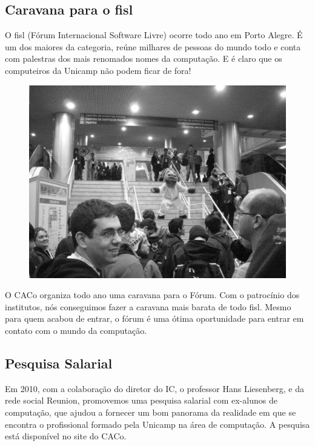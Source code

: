 \subsection{Caravana para o fisl}

O fisl (Fórum Internacional Software Livre) ocorre todo ano em Porto Alegre.
É um dos maiores da categoria, reúne milhares de pessoas do mundo todo e conta
com palestras dos mais renomados nomes da computação. E é claro que os
computeiros da Unicamp não podem ficar de fora!
\begin{figure}[h!]
    \vspace{-10pt}
    \centering
    \includegraphics[scale=0.58, keepaspectratio=true]{img/imgs/21-CACo/fisl11_1.jpg}
    \vspace{-10pt}
\end{figure}
O CACo organiza todo ano uma
caravana para o Fórum. Com o patrocínio dos institutos, nós conseguimos fazer
a caravana mais barata de todo fisl. Mesmo para quem acabou de entrar, o fórum
é uma ótima oportunidade para entrar em contato com o mundo da computação.

\subsection{Pesquisa Salarial}

Em 2010, com a colaboração do diretor do IC, o professor Hans Liesenberg,
e da rede social Reunion, promovemos uma pesquisa salarial com
ex-alunos de computação, que ajudou a fornecer um bom panorama da realidade em que se encontra
o profissional formado pela Unicamp na área de computação. A pesquisa
está disponível no site do CACo.

